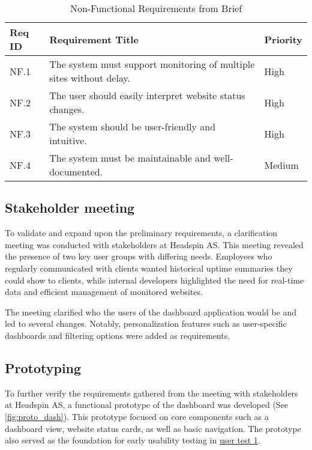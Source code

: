 \begin{table}[H]
    \centering
    \caption{Non-Functional Requirements from Brief}
    \label{tab:non_functional_reqs_brief}
    \begin{tabular}{| l  |p{}  |l |}
        \hline
        \textbf{Req ID} & \textbf{Requirement Title} & \textbf{Priority} \\
        \hline
        NF.1 & The system must support monitoring of multiple sites without delay. & High \\ \hline 
        NF.2 & The user should easily interpret website status changes. & High \\ \hline 
        NF.3 & The system should be user-friendly and intuitive. & High \\ \hline 
        NF.4 & The system must be maintainable and well-documented. & Medium \\ \hline
    \end{tabular}
\end{table}

\subsection{Stakeholder meeting}

To validate and expand upon the preliminary requirements, a clarification meeting was conducted with stakeholders at Headspin AS. This meeting revealed the presence of two key user groups with differing needs. Employees who regularly communicated with clients wanted historical uptime summaries they could show to clients, while internal developers highlighted the need for real-time data and efficient management of monitored websites.

The meeting clarified who the users of the dashboard application would be and led to several changes. Notably, personalization features such as user-specific dashboards and filtering options were added as requirements.

\newpage

\subsection{Prototyping}

To further verify the requirements gathered from the meeting with stakeholders at Headspin AS, a functional prototype of the dashboard was developed (See \ref{fig:proto_dash}). This prototype focused on core components such as a dashboard view,  website status cards, as well as basic navigation. The prototype also served as the foundation for early usability testing in \hyperref[subsec:user_testing]{user test 1}. 

